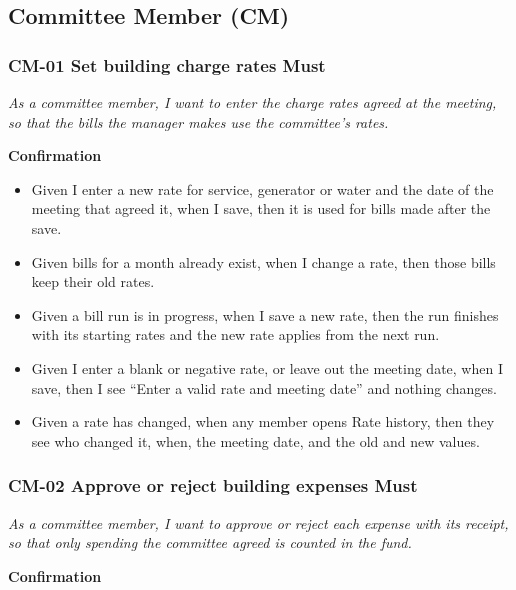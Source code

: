 \documentclass[11pt,a4paper]{report}
\begin{document}
\subsection{Committee Member (CM)}

\subsubsection*{CM-01 \textperiodcentered{} Set building charge rates \textperiodcentered{} Must}

\emph{As a committee member, I want to enter the charge rates agreed at the meeting, so that the bills the manager makes use the committee's rates.}

\medskip\noindent\textbf{Confirmation}\par

\begin{itemize}
  \item Given I enter a new rate for service, generator or water and the date of the meeting that agreed it, when I save, then it is used for bills made after the save.
  \item Given bills for a month already exist, when I change a rate, then those bills keep their old rates.
  \item Given a bill run is in progress, when I save a new rate, then the run finishes with its starting rates and the new rate applies from the next run.
  \item Given I enter a blank or negative rate, or leave out the meeting date, when I save, then I see ``Enter a valid rate and meeting date'' and nothing changes.
  \item Given a rate has changed, when any member opens Rate history, then they see who changed it, when, the meeting date, and the old and new values.
\end{itemize}

\subsubsection*{CM-02 \textperiodcentered{} Approve or reject building expenses \textperiodcentered{} Must}

\emph{As a committee member, I want to approve or reject each expense with its receipt, so that only spending the committee agreed is counted in the fund.}

\medskip\noindent\textbf{Confirmation}\par
\end{document}
